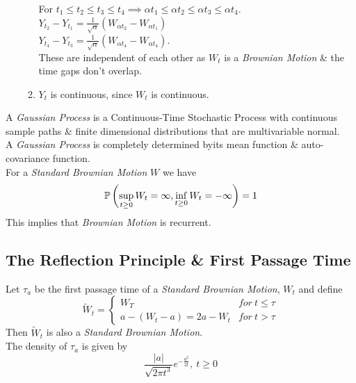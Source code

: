 \documentclass[11pt,a4paper]{article}
\begin{document}
\begin{enumerate}[label=\roman*)]
\begin{enumerate}
		For $t_1\leq t_2\leq t_3\leq t_4\implies \alpha t_1\leq\alpha t_2\leq\alpha t_3\leq\alpha t_4$.\\
		$Y_{t_2}-Y_{t_1}=\frac{1}{\sqrt{\alpha}}(W_{\alpha t_2}-W_{\alpha t_1})$\\
		$Y_{t_4}-Y_{t_3}=\frac{1}{\sqrt{\alpha}}(W_{\alpha t_4}-W_{\alpha t_4})$.\\
		These are independent of each other as $W_t$ is a \textit{Brownian Motion} \& the time gaps don't overlap.
		\item $Y_t$ is continuous, since $W_t$ is continuous.
	\end{enumerate}
\end{enumerate}


A \textit{Gaussian Process} is a Continuous-Time Stochastic Process with continuous sample paths \& finite dimensional distributions that are multivariable normal.\\
A \textit{Gaussian Process} is completely determined byits mean function \& auto-covariance function.\\

For a \textit{Standard Brownian Motion} $W$ we have
$$\mathbb{P}\left(\sup_{t\geq0}W_t=\infty,\inf_{t\geq0}W_t=-\infty\right)=1$$
\nb This implies that \textit{Brownian Motion} is recurrent.\\

\subsection{The Reflection Principle \& First Passage Time}

Let $\tau_a$ be the first passage time of a \textit{Standard Brownian Motion}, $W_t$ and define
$$\widetilde{W}_t=\begin{cases}W_T&for\ t\leq\tau\\a-(W_t-a)=2a-W_t&for\ t>\tau\end{cases}$$
Then $\widetilde{W}_t$ is also a \textit{Standard Brownian Motion}.\\

The density of $\tau_a$ is given by
$$\frac{|a|}{\sqrt{2\pi t^3}}e^{-\frac{a^2}{2t}},\ t\geq0$$
\end{document}
